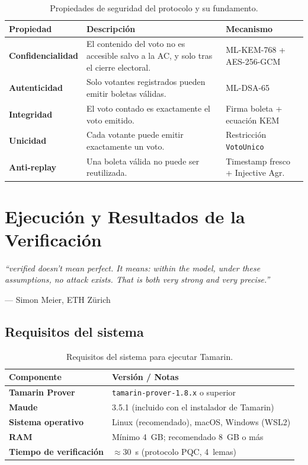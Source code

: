 \documentclass[12pt, a4paper, twoside, openright]{book}
\begin{document}
\begin{table}[H]
\centering
\caption{Propiedades de seguridad del protocolo y su fundamento.}
\label{tab:propiedades}
\begin{tabularx}{\textwidth}{>{\bfseries}p{3cm} X p{3.5cm}}
\toprule
Propiedad & Descripci\'on & Mecanismo \\
\midrule
Confidencialidad &
  El contenido del voto no es accesible salvo a la AC, y solo
  tras el cierre electoral. &
  ML-KEM-768 + AES-256-GCM \\[5pt]
Autenticidad &
  Solo votantes registrados pueden emitir boletas v\'alidas. &
  ML-DSA-65 \\[5pt]
Integridad &
  El voto contado es exactamente el voto emitido. &
  Firma boleta + ecuaci\'on KEM \\[5pt]
Unicidad &
  Cada votante puede emitir exactamente un voto. &
  Restricci\'on \texttt{VotoUnico} \\[5pt]
Anti-replay &
  Una boleta v\'alida no puede ser reutilizada. &
  Timestamp fresco + Injective Agr. \\
\bottomrule
\end{tabularx}
\end{table}

\chapter{Ejecuci\'on y Resultados de la Verificaci\'on}

\epigraph{%
  \textit{``verified doesn't mean perfect. It means: within the model,
  under these assumptions, no attack exists. That is both very strong
  and very precise.''}
}{--- Simon Meier, ETH Z\"urich}

\section{Requisitos del sistema}

\begin{table}[H]
\centering
\caption{Requisitos del sistema para ejecutar Tamarin.}
\label{tab:requisitos}
\begin{tabular}{>{\bfseries}p{4cm} p{8cm}}
\toprule
Componente & Versi\'on / Notas \\
\midrule
Tamarin Prover & \texttt{tamarin-prover-1.8.x} o superior \\[3pt]
Maude & 3.5.1 (incluido con el instalador de Tamarin) \\[3pt]
Sistema operativo & Linux (recomendado), macOS, Windows (WSL2) \\[3pt]
RAM & M\'inimo 4~GB; recomendado 8~GB o m\'as \\[3pt]
Tiempo de verificaci\'on & $\approx 30$~s (protocolo PQC, 4~lemas) \\
\bottomrule
\end{tabular}
\end{table}
\end{document}
